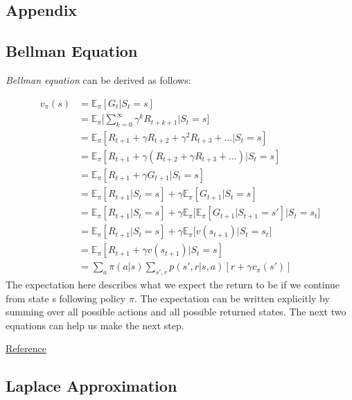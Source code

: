 \renewcommand{\thesection}{\Alph{section}.\arabic{section}}
\setcounter{section}{0}

\begin{appendices}
\chapter{Appendix}

\section{Bellman Equation}

\textit{Bellman equation} can be derived as follows:

\begin{align*}
	v_\pi(s) &= \mathbb{E}_\pi[G_t|S_t=s]\\
	& = \mathbb{E}_\pi\Bigg[\sum_{k=0}^{\infty}\gamma^k R_{t+k+1}\Big|S_t=s\Bigg]\\
	& = \mathbb{E}_\pi[R_{t+1} + \gamma R_{t+2} + \gamma^2 R_{t+3} + ...|S_t=s]\\
	& = \mathbb{E}_\pi[R_{t+1} + \gamma (R_{t+2} + \gamma R_{t+3} + ...)|S_t=s]\\
	& = \mathbb{E}_\pi[R_{t+1} + \gamma G_{t+1}|S_t=s]\\
	& = \mathbb{E}_\pi[R_{t+1}|S_t=s] + \gamma \mathbb{E}_\pi[ G_{t+1}|S_t=s]\\
	& = \mathbb{E}_\pi[R_{t+1}|S_t=s] + \gamma \mathbb{E}_\pi\Big[\mathbb{E}_\pi[ G_{t+1}|S_{t+1}=s']\Big|S_t = s_t\Big] \\
	& = \mathbb{E}_\pi[R_{t+1}|S_t=s] + \gamma \mathbb{E}_\pi\Big[v(s_{t+1})\Big|S_t = s_t\Big]\\
	& = \mathbb{E}_\pi[R_{t+1} + \gamma v(s_{t+1})|S_t=s]\\
	& = \sum_{a}\pi(a|s)\sum_{s',r}p(s',r|s,a)[r + \gamma v_\pi(s')]
\end{align*}
The expectation here describes what we expect the return to be if we continue from state s following policy $\pi$. The expectation can be written explicitly by summing over all possible actions and all possible returned states. The next two equations can help us make the next step.

\href{https://stats.stackexchange.com/questions/243384/deriving-bellmans-equation-in-reinforcement-learning}{Reference}

\section{Laplace Approximation}


\end{appendices}
